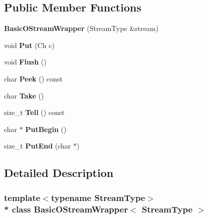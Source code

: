 \subsection*{Public Member Functions}
\begin{DoxyCompactItemize}
\item 
{\bfseries Basic\+O\+Stream\+Wrapper} (Stream\+Type \&stream)\hypertarget{a00047_a067a516c13b7c9d4dacef598d32779ef}{}\label{a00047_a067a516c13b7c9d4dacef598d32779ef}

\item 
void {\bfseries Put} (Ch c)\hypertarget{a00047_a7d3ba9d651fbe27fe05387f512154ea8}{}\label{a00047_a7d3ba9d651fbe27fe05387f512154ea8}

\item 
void {\bfseries Flush} ()\hypertarget{a00047_a1c48a8b7520b0ab6ca34e665b928b56d}{}\label{a00047_a1c48a8b7520b0ab6ca34e665b928b56d}

\item 
char {\bfseries Peek} () const \hypertarget{a00047_a81eda65252d99c350d754bb702526dae}{}\label{a00047_a81eda65252d99c350d754bb702526dae}

\item 
char {\bfseries Take} ()\hypertarget{a00047_a54be63e8d24f4d82329b860a907f65fe}{}\label{a00047_a54be63e8d24f4d82329b860a907f65fe}

\item 
size\+\_\+t {\bfseries Tell} () const \hypertarget{a00047_ab5f119855c8591b650fbcbeb99be677e}{}\label{a00047_ab5f119855c8591b650fbcbeb99be677e}

\item 
char $\ast$ {\bfseries Put\+Begin} ()\hypertarget{a00047_a564b7b727bdab12185e7a7bd1ac5e822}{}\label{a00047_a564b7b727bdab12185e7a7bd1ac5e822}

\item 
size\+\_\+t {\bfseries Put\+End} (char $\ast$)\hypertarget{a00047_a1da108e43a5a517c4484821fced1fca0}{}\label{a00047_a1da108e43a5a517c4484821fced1fca0}

\end{DoxyCompactItemize}


\subsection{Detailed Description}
\subsubsection*{template$<$typename Stream\+Type$>$\\*
class Basic\+O\+Stream\+Wrapper$<$ Stream\+Type $>$}

